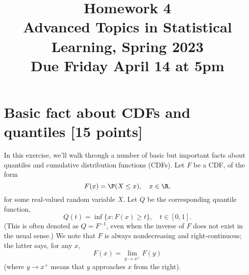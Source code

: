 \documentclass{article}
\title{Homework 4 \\ \smallskip
\large Advanced Topics in Statistical Learning, Spring 2023 \\ \smallskip
Due Friday April 14 at 5pm}
\date{}
\begin{document}
\maketitle
\RaggedRight
\vspace{-50pt}

\section{Basic fact about CDFs and quantiles [15 points]}

In this exercise, we'll walk through a number of basic but important facts about 
quantiles and cumulative distribution functions (CDFs). Let $F$ be a CDF, of the
form 
\[
F(x) = \P(X \leq x), \quad x \in \R,
\]
for some real-valued random variable $X$. Let $Q$ be the corresponding quantile 
function,
\[
Q(t) = \inf \{ x : F(x) \geq t \}, \quad t \in [0,1].
\]
(This is often denoted as $Q = F^{-1}$, even when the inverse of $F$ does not
exist in the usual sense.) We note that $F$ is always nondecreasing and 
right-continuous; the latter says, for any $x$,    
\[
F(x) = \lim_{y \to x^+} F(y)
\]
(where $y \to x^+$ means that $y$ approaches $x$ from the right).
\end{document}
